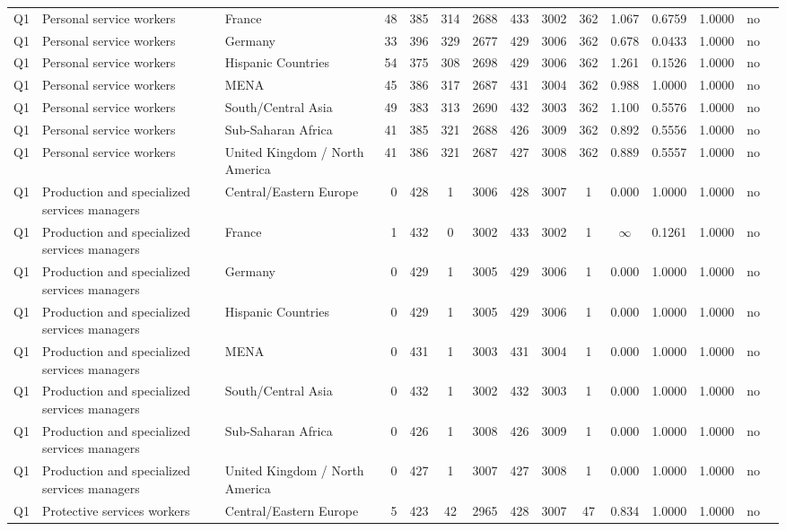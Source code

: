 \begin{longtable}{lllrcccccccccll}
Q1 & Personal service workers & France & 48 & 385 & 314 & 2688 & 433 & 3002 & 362 & 1.067 & 0.6759 & 1.0000 & no \\
Q1 & Personal service workers & Germany & 33 & 396 & 329 & 2677 & 429 & 3006 & 362 & 0.678 & 0.0433 & 1.0000 & no \\
Q1 & Personal service workers & Hispanic Countries & 54 & 375 & 308 & 2698 & 429 & 3006 & 362 & 1.261 & 0.1526 & 1.0000 & no \\
Q1 & Personal service workers & MENA & 45 & 386 & 317 & 2687 & 431 & 3004 & 362 & 0.988 & 1.0000 & 1.0000 & no \\
Q1 & Personal service workers & South/Central Asia & 49 & 383 & 313 & 2690 & 432 & 3003 & 362 & 1.100 & 0.5576 & 1.0000 & no \\
Q1 & Personal service workers & Sub-Saharan Africa & 41 & 385 & 321 & 2688 & 426 & 3009 & 362 & 0.892 & 0.5556 & 1.0000 & no \\
Q1 & Personal service workers & United Kingdom / North America & 41 & 386 & 321 & 2687 & 427 & 3008 & 362 & 0.889 & 0.5557 & 1.0000 & no \\
Q1 & Production and specialized services managers & Central/Eastern Europe & 0 & 428 & 1 & 3006 & 428 & 3007 & 1 & 0.000 & 1.0000 & 1.0000 & no \\
Q1 & Production and specialized services managers & France & 1 & 432 & 0 & 3002 & 433 & 3002 & 1 & $\infty$ & 0.1261 & 1.0000 & no \\
Q1 & Production and specialized services managers & Germany & 0 & 429 & 1 & 3005 & 429 & 3006 & 1 & 0.000 & 1.0000 & 1.0000 & no \\
Q1 & Production and specialized services managers & Hispanic Countries & 0 & 429 & 1 & 3005 & 429 & 3006 & 1 & 0.000 & 1.0000 & 1.0000 & no \\
Q1 & Production and specialized services managers & MENA & 0 & 431 & 1 & 3003 & 431 & 3004 & 1 & 0.000 & 1.0000 & 1.0000 & no \\
Q1 & Production and specialized services managers & South/Central Asia & 0 & 432 & 1 & 3002 & 432 & 3003 & 1 & 0.000 & 1.0000 & 1.0000 & no \\
Q1 & Production and specialized services managers & Sub-Saharan Africa & 0 & 426 & 1 & 3008 & 426 & 3009 & 1 & 0.000 & 1.0000 & 1.0000 & no \\
Q1 & Production and specialized services managers & United Kingdom / North America & 0 & 427 & 1 & 3007 & 427 & 3008 & 1 & 0.000 & 1.0000 & 1.0000 & no \\
Q1 & Protective services workers & Central/Eastern Europe & 5 & 423 & 42 & 2965 & 428 & 3007 & 47 & 0.834 & 1.0000 & 1.0000 & no \\

\end{longtable}
